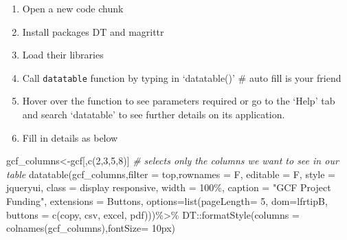 \documentclass[
]{book}
\newenvironment{Shaded}{\begin{snugshade}}{\end{snugshade}}
\newcommand{\AttributeTok}[1]{\textcolor[rgb]{0.77,0.63,0.00}{#1}}
\newcommand{\CommentTok}[1]{\textcolor[rgb]{0.56,0.35,0.01}{\textit{#1}}}
\newcommand{\DecValTok}[1]{\textcolor[rgb]{0.00,0.00,0.81}{#1}}
\newcommand{\FunctionTok}[1]{\textcolor[rgb]{0.00,0.00,0.00}{#1}}
\newcommand{\NormalTok}[1]{#1}
\newcommand{\OtherTok}[1]{\textcolor[rgb]{0.56,0.35,0.01}{#1}}
\newcommand{\SpecialCharTok}[1]{\textcolor[rgb]{0.00,0.00,0.00}{#1}}
\newcommand{\StringTok}[1]{\textcolor[rgb]{0.31,0.60,0.02}{#1}}
\providecommand{\tightlist}{%
  \setlength{\itemsep}{0pt}\setlength{\parskip}{0pt}}
\begin{document}
\begin{enumerate}
\def\labelenumi{\arabic{enumi}.}
\tightlist
\item
  Open a new code chunk
\item
  Install packages DT and magrittr
\item
  Load their libraries\\
\item
  Call \texttt{datatable} function by typing in `datatable()' \# auto fill is your friend
\item
  Hover over the function to see parameters required or go to the `Help' tab and search `datatable' to see further details on its application.
\item
  Fill in details as below
\end{enumerate}

\begin{Shaded}
\begin{Highlighting}[]
\NormalTok{gcf\_columns}\OtherTok{\textless{}{-}}\NormalTok{gcf[,}\FunctionTok{c}\NormalTok{(}\DecValTok{2}\NormalTok{,}\DecValTok{3}\NormalTok{,}\DecValTok{5}\NormalTok{,}\DecValTok{8}\NormalTok{)] }\CommentTok{\# selects only the columns we want to see in our table}
\FunctionTok{datatable}\NormalTok{(gcf\_columns,}\AttributeTok{filter =} \StringTok{\textquotesingle{}top\textquotesingle{}}\NormalTok{,}\AttributeTok{rownames =}\NormalTok{ F, }\AttributeTok{editable =}\NormalTok{ F, }\AttributeTok{style =} \StringTok{\textquotesingle{}jqueryui\textquotesingle{}}\NormalTok{, }\AttributeTok{class =} \StringTok{\textquotesingle{}display responsive\textquotesingle{}}\NormalTok{, }\AttributeTok{width =} \StringTok{\textquotesingle{}100\%\textquotesingle{}}\NormalTok{, }\AttributeTok{caption =} \StringTok{"GCF Project Funding"}\NormalTok{, }\AttributeTok{extensions =} \StringTok{\textquotesingle{}Buttons\textquotesingle{}}\NormalTok{, }\AttributeTok{options=}\FunctionTok{list}\NormalTok{(}\AttributeTok{pageLength=} \DecValTok{5}\NormalTok{, }\AttributeTok{dom=}\StringTok{\textquotesingle{}lfrtipB\textquotesingle{}}\NormalTok{, }\AttributeTok{buttons =} \FunctionTok{c}\NormalTok{(}\StringTok{\textquotesingle{}copy\textquotesingle{}}\NormalTok{, }\StringTok{\textquotesingle{}csv\textquotesingle{}}\NormalTok{, }\StringTok{\textquotesingle{}excel\textquotesingle{}}\NormalTok{, }\StringTok{\textquotesingle{}pdf\textquotesingle{}}\NormalTok{)))}\SpecialCharTok{\%\textgreater{}\%}
\NormalTok{  DT}\SpecialCharTok{::}\FunctionTok{formatStyle}\NormalTok{(}\AttributeTok{columns =} \FunctionTok{colnames}\NormalTok{(gcf\_columns),}\AttributeTok{fontSize=} \StringTok{\textquotesingle{}10px\textquotesingle{}}\NormalTok{)}
\end{Highlighting}
\end{Shaded}
\end{document}
